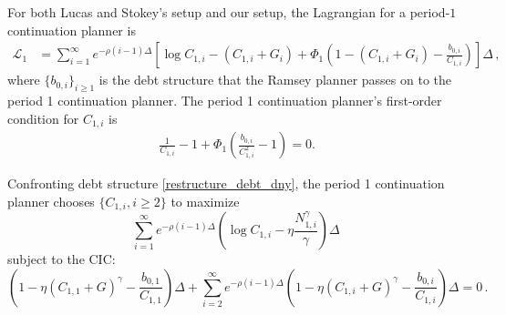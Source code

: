 \documentclass[12pt]{article}
\begin{document}
For  both Lucas and Stokey's setup and our setup, the   Lagrangian for a  period-$1$ continuation planner is %
\begin{align}\label{L11}
	{\mathcal L}^{}_1 & =  \sum_{i=1}^{\infty}  e^{-\rho (i-1)\Delta}\left[ \log C_{1, i}-  (C_{1, i}+G_{i})+ \Phi_1^{}\left( 1-(C_{1, i}+G_{i})-\frac{b_{0, i}^{}}{C_{1, i}}\right)  \right] \Delta \, , %
\end{align}
where  $\{b_{0, i}\}_{i\geq 1}$ is the   debt structure that the Ramsey planner passes on to the period 1  continuation planner. %
The period 1  continuation planner's first-order condition for $C_{1,i}$ is %
\begin{align}\label{FOC531}
	\frac{1}{C_{1, i}} -1 +\Phi_1\left( \frac{b_{0, i}}{C_{1, i}^2} -1 \right) =0.
\end{align}


Confronting  debt structure  \eqref{restructure_debt_dny},  
the period 1 continuation planner chooses  $\{ C_{1, i}, i\geq 2\}$ to maximize %
$$	\sum_{i=1}^{\infty} e^{-\rho (i-1)\Delta} \left( \log C_{1, i}- \eta \frac{N_{1, i}^\gamma}{\gamma} \right)\Delta \, $$ 
subject to the CIC: %
\begin{equation}
	\left(1-\eta(C_{1, 1}+G)^\gamma-\frac{b_{0, 1}}{C_{1, 1}}\right)\Delta+\sum_{i=2}^\infty e^{-\rho (i-1)\Delta}\left( 1-\eta(C_{1, i}+G)^\gamma-\frac{b_{0, i}}{C_{1, i}} \right)\Delta =0 \, . \label{IC_dny21}
\end{equation}
\end{document}
